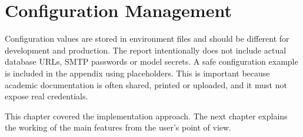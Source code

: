 \section{Configuration Management}

Configuration values are stored in environment files and should be different for development and production. The report intentionally does not include actual database URLs, SMTP passwords or model secrets. A safe configuration example is included in the appendix using placeholders. This is important because academic documentation is often shared, printed or uploaded, and it must not expose real credentials.

This chapter covered the implementation approach. The next chapter explains the working of the main features from the user's point of view.
